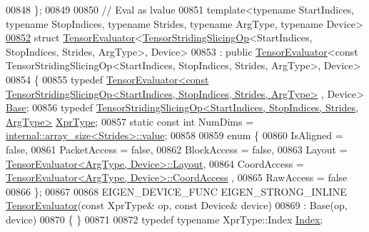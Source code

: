 \begin{DoxyCode}
00848 \};
00849 
00850 \textcolor{comment}{// Eval as lvalue}
00851 \textcolor{keyword}{template}<\textcolor{keyword}{typename} StartIndices, \textcolor{keyword}{typename} StopIndices, \textcolor{keyword}{typename} Str\textcolor{keywordtype}{id}es, \textcolor{keyword}{typename} ArgType, \textcolor{keyword}{typename} Device>
\hyperlink{struct_eigen_1_1_tensor_evaluator_3_01_tensor_striding_slicing_op_3_01_start_indices_00_01_stop_b19fd6c14958f7e749ce3c389a8eda72}{00852} \textcolor{keyword}{struct }\hyperlink{struct_eigen_1_1_tensor_evaluator}{TensorEvaluator}<\hyperlink{class_eigen_1_1_tensor_striding_slicing_op}{TensorStridingSlicingOp}<StartIndices, 
      StopIndices, Strides, ArgType>, Device>
00853   : \textcolor{keyword}{public} \hyperlink{struct_eigen_1_1_tensor_evaluator}{TensorEvaluator}<const TensorStridingSlicingOp<StartIndices, StopIndices, Strides,
       ArgType>, Device>
00854 \{
00855   \textcolor{keyword}{typedef} 
      \hyperlink{struct_eigen_1_1_tensor_evaluator}{TensorEvaluator<const TensorStridingSlicingOp<StartIndices, StopIndices, Strides, ArgType>}
      , Device> \hyperlink{struct_eigen_1_1_tensor_evaluator_3_01const_01_tensor_striding_slicing_op_3_01_start_indices_00_cee1ff5835d6d215dedc4ac8d5000be4}{Base};
00856   \textcolor{keyword}{typedef} \hyperlink{class_eigen_1_1_tensor_striding_slicing_op}{TensorStridingSlicingOp<StartIndices, StopIndices, Strides, ArgType>}
       \hyperlink{class_eigen_1_1_tensor_striding_slicing_op}{XprType};
00857   \textcolor{keyword}{static} \textcolor{keyword}{const} \textcolor{keywordtype}{int} NumDims = \hyperlink{struct_eigen_1_1internal_1_1array__size}{internal::array\_size<Strides>::value};
00858 
00859   \textcolor{keyword}{enum} \{
00860     IsAligned = \textcolor{keyword}{false},
00861     PacketAccess = \textcolor{keyword}{false},
00862     BlockAccess = \textcolor{keyword}{false},
00863     Layout = \hyperlink{struct_eigen_1_1_tensor_evaluator}{TensorEvaluator<ArgType, Device>::Layout},
00864     CoordAccess = \hyperlink{struct_eigen_1_1_tensor_evaluator}{TensorEvaluator<ArgType, Device>::CoordAccess}
      ,
00865     RawAccess = \textcolor{keyword}{false}
00866   \};
00867 
00868   EIGEN\_DEVICE\_FUNC EIGEN\_STRONG\_INLINE \hyperlink{struct_eigen_1_1_tensor_evaluator}{TensorEvaluator}(\textcolor{keyword}{const} XprType& op, \textcolor{keyword}{const} Device& 
      device)
00869     : Base(op, device)
00870     \{ \}
00871 
00872   \textcolor{keyword}{typedef} \textcolor{keyword}{typename} XprType::Index \hyperlink{namespace_eigen_a62e77e0933482dafde8fe197d9a2cfde}{Index};

\end{DoxyCode}
